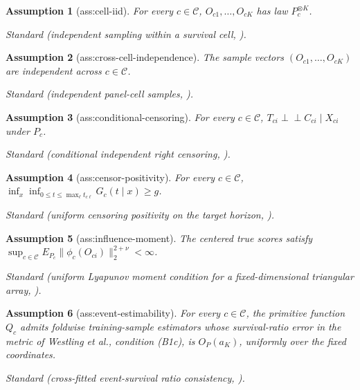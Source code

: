 \documentclass{article}
\newtheorem{assumption}{Assumption}
\begin{document}
\begin{assumption}[ass:cell-iid]\label{ass:cell-iid}
For every \(c\in\mathcal C\), \(O_{c1},\ldots,O_{cK}\) has law \(P_c^{\otimes K}\).
\par\smallskip\noindent\emph{Standard} (independent sampling within a survival cell, \cite{WestlingLuedtkeGilbertCarone2024}).
\end{assumption}

\begin{assumption}[ass:cross-cell-independence]\label{ass:cross-cell-independence}
The sample vectors \((O_{c1},\ldots,O_{cK})\) are independent across \(c\in\mathcal C\).
\par\smallskip\noindent\emph{Standard} (independent panel-cell samples, \cite{HanShah2025SSC}).
\end{assumption}

\begin{assumption}[ass:conditional-censoring]\label{ass:conditional-censoring}
For every \(c\in\mathcal C\), \(T_{ci}\mathbin{\perp\!\!\!\perp}C_{ci}\mid X_{ci}\) under \(P_c\).
\par\smallskip\noindent\emph{Standard} (conditional independent right censoring, \cite{WestlingLuedtkeGilbertCarone2024}).
\end{assumption}

\begin{assumption}[ass:censor-positivity]\label{ass:censor-positivity}
For every \(c\in\mathcal C\), \(\inf_{x}\inf_{0\le t\le\max_\ell t_{c\ell}}G_c(t\mid x)\ge g\).
\par\smallskip\noindent\emph{Standard} (uniform censoring positivity on the target horizon, \cite{WestlingLuedtkeGilbertCarone2024}).
\end{assumption}

\begin{assumption}[ass:influence-moment]\label{ass:influence-moment}
The centered true scores satisfy \(\sup_{c\in\mathcal C}E_{P_c}\|\phi_c(O_{ci})\|_2^{2+\nu}<\infty\).
\par\smallskip\noindent\emph{Standard} (uniform Lyapunov moment condition for a fixed-dimensional triangular array, \cite{ChernozhukovEtAl2018DML}).
\end{assumption}

\begin{assumption}[ass:event-estimability]\label{ass:event-estimability}
For every \(c\in\mathcal C\), the primitive function \(Q_c\) admits foldwise training-sample estimators whose survival-ratio error in the metric of Westling et al., condition (B1c), is \(O_P(a_K)\), uniformly over the fixed coordinates.
\par\smallskip\noindent\emph{Standard} (cross-fitted event-survival ratio consistency, \cite{WestlingLuedtkeGilbertCarone2024}).
\end{assumption}
\end{document}
